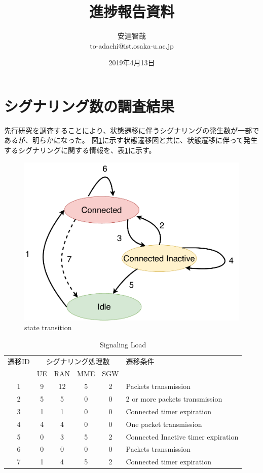 \documentclass[a4j]{ujarticle}
\title{進捗報告資料}
\author{安達智哉\\to-adachi@ist.osaka-u.ac.jp}
\date{2019年4月13日}
\begin{document}
\maketitle


\section{シグナリング数の調査結果}
\label{sec:signalings}
先行研究を調査することにより、状態遷移に伴うシグナリングの発生数が一部であるが、明らかになった。
図\ref{state_id}に示す状態遷移図と共に、状態遷移に伴って発生するシグナリングに関する情報を、表\ref{table:signalings_all}に示す。

\begin{figure}[htbp]
  \centering
  \includegraphics[width=0.9\hsize]{state_id.pdf}
  \caption{state transition}
  \label{state_id}
\end{figure}

\begin{table}[htbp]
  \centering
  \caption{Signaling Load}
  \label{table:signalings_all}
  \begin{tabular}{c|cccc|l}
    \hline
    遷移ID  & \multicolumn{4}{|c|}{シグナリング処理数} & 遷移条件                          \\
            & UE      & RAN     & MME     & SGW      &                                   \\ \hline \hline
    1       & 9       & 12      & 5       & 2        & Packets transmission              \\
    2       & 5       & 5       & 0       & 0        & 2 or more packets transmission    \\
    3       & 1       & 1       & 0       & 0        & Connected timer expiration        \\
    4       & 4       & 4       & 0       & 0        & One packet transmission           \\
    5       & 0       & 3       & 5       & 2        & Connected Inactive timer expiration             \\
    6       & 0       & 0       & 0       & 0        & Packets transmission              \\
    7       & 1       & 4       & 5       & 2        & Connected timer expiration            \\ \hline
  \end{tabular}
\end{table}
\end{document}
